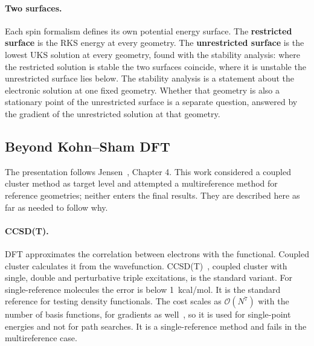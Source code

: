\paragraph{Two surfaces.} Each spin formalism defines its own potential
energy surface. The \textbf{restricted surface} is the RKS energy at
every geometry. The \textbf{unrestricted surface} is the lowest UKS
solution at every geometry, found with the stability analysis: where
the restricted solution is stable the two surfaces coincide, where it
is unstable the unrestricted surface lies below. The stability analysis
is a statement about the electronic solution at one fixed geometry.
Whether that geometry is also a stationary point of the unrestricted
surface is a separate question, answered by the gradient of the
unrestricted solution at that geometry.


\subsection{Beyond Kohn--Sham DFT}
\label{sec:background-beyond}

The presentation follows Jensen~\cite{jensen2017}, Chapter 4. This work
considered a coupled cluster method as target level and attempted a
multireference method for reference geometries; neither enters the
final results. They are described here as far as
needed to follow why.

\paragraph{CCSD(T).} DFT approximates the correlation between electrons
with the functional. Coupled cluster calculates it from the wavefunction.
\mbox{CCSD(T)}~\cite{raghavachari1989}, coupled cluster with single,
double and perturbative triple excitations, is the standard variant. For
single-reference molecules the error is below 1~kcal/mol. It is the
standard reference for testing density functionals. The cost scales as
$\mathcal{O}(N^7)$ with the number of basis functions, for gradients as
well~\cite{scuseria1991}, so it is used for single-point energies and not
for path searches. It is a single-reference method and fails in the
multireference case.

